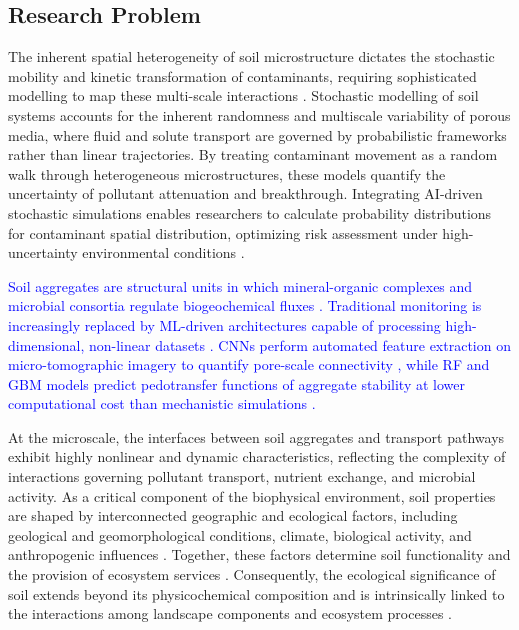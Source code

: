 \documentclass[environments,article,submit,pdftex,moreauthors]{Definitions/mdpi}
\begin{document}
\subsection{Research Problem}\label{sec1.2}

The inherent spatial heterogeneity of soil microstructure dictates the
stochastic mobility and kinetic transformation of contaminants, requiring
sophisticated modelling to map these multi-scale interactions \cite{2018.05.005}.
Stochastic modelling of soil systems accounts for the inherent randomness and
multiscale variability of porous media, where fluid and solute transport are
governed by probabilistic frameworks rather than linear trajectories. By treating contaminant movement as a random
walk through heterogeneous microstructures, these models quantify the
uncertainty of pollutant attenuation and breakthrough.
Integrating AI-driven stochastic simulations enables researchers to calculate
probability distributions for contaminant spatial distribution,
optimizing risk assessment under high-uncertainty environmental conditions
\cite{Olawade}.

\textcolor{blue}{Soil aggregates are structural units in which mineral-organic complexes and microbial consortia regulate biogeochemical fluxes \cite{Six2004}. Traditional monitoring is increasingly replaced by ML-driven architectures capable of processing high-dimensional, non-linear datasets \cite{Lal2015,Baveye2016}. CNNs perform automated feature extraction on micro-tomographic imagery to quantify pore-scale connectivity \cite{Demiral2026,Chen2025}, while RF and GBM models predict pedotransfer functions of aggregate stability at lower computational cost than mechanistic simulations \cite{Guo2026}.}

At the microscale, the interfaces between soil aggregates and transport
pathways exhibit highly nonlinear and dynamic characteristics, reflecting the
complexity of interactions governing pollutant transport, nutrient exchange,
and microbial activity. As a critical component of the biophysical environment,
soil properties are shaped by interconnected geographic and ecological factors,
including geological and geomorphological conditions, climate, biological
activity, and anthropogenic influences \cite{Wangetal2010,Brevik2015,Wu168627}.
Together, these factors determine soil functionality and the provision of
ecosystem services \cite{Baveye2016,Klaucol2013,Klaucol2017}.
Consequently, the ecological significance of soil extends beyond its
physicochemical composition and is intrinsically linked to the interactions
among landscape components and ecosystem processes \cite{geomatics5010005}.
\end{document}
